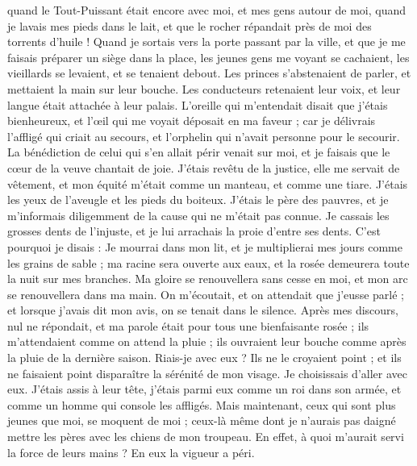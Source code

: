 \begin{multicols}{2}
quand le Tout-Puissant était encore avec moi, et mes gens autour de moi,
quand je lavais mes pieds dans le lait, et que le rocher répandait près de moi des torrents d'huile !
Quand je sortais vers la porte passant par la ville, et que je me faisais préparer un siège dans la place,
les jeunes gens me voyant se cachaient, les vieillards se levaient, et se tenaient debout.
Les princes s'abstenaient de parler, et mettaient la main sur leur bouche.
Les conducteurs retenaient leur voix, et leur langue était attachée à leur palais.
L'oreille qui m'entendait disait que j'étais bienheureux, et l'œil qui me voyait déposait en ma faveur ;
car je délivrais l'affligé qui criait au secours, et l'orphelin qui n'avait personne pour le secourir.
La bénédiction de celui qui s'en allait périr venait sur moi, et je faisais que le cœur de la veuve chantait de joie.
J'étais revêtu de la justice, elle me servait de vêtement, et mon équité m'était comme un manteau, et comme une tiare.
J'étais les yeux de l'aveugle et les pieds du boiteux.
J'étais le père des pauvres, et je m'informais diligemment de la cause qui ne m'était pas connue.
Je cassais les grosses dents de l'injuste, et je lui arrachais la proie d'entre ses dents.
C'est pourquoi je disais : Je mourrai dans mon lit, et je multiplierai mes jours comme les grains de sable ;
ma racine sera ouverte aux eaux, et la rosée demeurera toute la nuit sur mes branches. 
Ma gloire se renouvellera sans cesse en moi, et mon arc se renouvellera dans ma main.
On m'écoutait, et on attendait que j'eusse parlé ; et lorsque j'avais dit mon avis, on se tenait dans le silence.
Après mes discours, nul ne répondait, et ma parole était pour tous une bienfaisante rosée ;
ils m'attendaient comme on attend la pluie ; ils ouvraient leur bouche comme après la pluie de la dernière saison.
Riais-je avec eux ? Ils ne le croyaient point ; et ils ne faisaient point disparaître la sérénité de mon visage.
Je choisissais d'aller avec eux. J'étais assis à leur tête, j'étais parmi eux comme un roi dans son armée, et comme un homme qui console les affligés.
\VerseOne{}Mais maintenant, ceux qui sont plus jeunes que moi, se moquent de moi ; ceux-là même dont je n'aurais pas daigné mettre les pères avec les chiens de mon troupeau.
 En effet, à quoi m'aurait servi la force de leurs mains ? En eux la vigueur a péri. 

\end{multicols}
